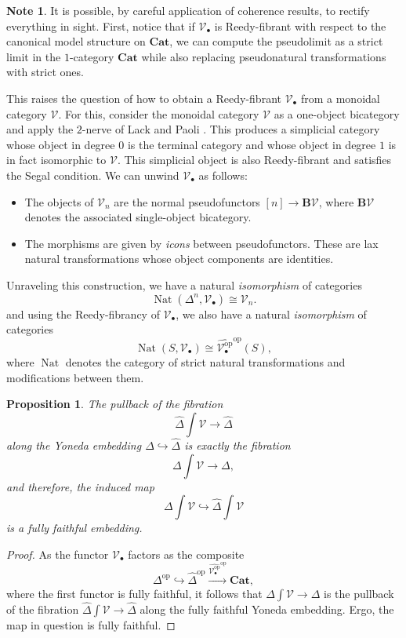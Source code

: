 \documentclass[a4paper]{article}
\numberwithin{equation}{subsection}
\theoremstyle{plain}   %
\newtheorem{prop}[equation]{Proposition}
\theoremstyle{definition}
\newtheorem{note}[equation]{Note}
\theoremstyle{remark}
\theoremstyle{plain}
\newcommand{\op}{\ensuremath{\mathrm{op}}}
\newcommand{\Cat}{\ensuremath{\mathbf{Cat}}}
\newcommand{\psh}[1]{\ensuremath{\widehat{#1}}}
\begin{document}
\begin{note}
	It is possible, by careful application of coherence results, to rectify everything in sight.  First, notice that if \(\mathcal{V}_\bullet\) is Reedy-fibrant with respect to the canonical model structure on \(\Cat\), we can compute the pseudolimit as a strict limit in the \(1\)-category \(\Cat\) while also replacing pseudonatural transformations with strict ones.  
	
	This raises the question of how to obtain a Reedy-fibrant \(\mathcal{V}_\bullet\) from a monoidal category \(\mathcal{V}\).  For this, consider the monoidal category \(\mathcal{V}\) as a one-object bicategory and apply the \(2\)-nerve of Lack and Paoli \cite{lack-paoli}.  This produces a simplicial category whose object in degree \(0\) is the terminal category and whose object in degree \(1\) is in fact isomorphic to \(\mathcal{V}\).  This simplicial object is also Reedy-fibrant and satisfies the Segal condition.  We can unwind \(\mathcal{V}_\bullet\) as follows:
	\begin{itemize}
		\item The objects of \(\mathcal{V}_n\) are the normal pseudofunctors \([n] \to \mathbf{B}\mathcal{V}\), where \(\mathbf{B}\mathcal{V}\) denotes the associated single-object bicategory.
		\item The morphisms are given by \emph{icons} between pseudofunctors.  These are lax natural transformations whose object components are identities.
	\end{itemize}
	Unraveling this construction, we have a natural \emph{isomorphism} of categories 
	\[
		\operatorname{Nat}(\Delta^n, \mathcal{V}_\bullet) \cong \mathcal{V}_n.
	\]
	and using the Reedy-fibrancy of \(\mathcal{V}_\bullet\), we also have a natural \emph{isomorphism} of categories
	\[
		\operatorname{Nat}(S,\mathcal{V}_\bullet) \cong \psh{\mathcal{V}^\op_\bullet}^\op(S),
	\]
	where \(\operatorname{Nat}\) denotes the category of strict natural transformations and modifications between them.
\end{note}
\begin{prop} The pullback of the fibration 
	\[
		\psh{\Delta}\int \mathcal{V} \to \psh{\Delta}
	\]
	along the Yoneda embedding \(\Delta\hookrightarrow \psh{\Delta}\) is exactly the fibration 
	\[
		\Delta\int\mathcal{V}\to \Delta,
	\]
	and therefore, the induced map
	\[
		\Delta\int\mathcal{V}\hookrightarrow \psh{\Delta}\int\mathcal{V}
	\]
	is a fully faithful embedding.
\end{prop}
\begin{proof}  As the functor \(\mathcal{V}_\bullet\) factors as the composite 
	\[\Delta^\op \hookrightarrow \psh{\Delta}^\op \xrightarrow{\psh{\mathcal{V}^\op_\bullet}^\op} \Cat,\] where the first functor is fully faithful, it follows that \(\Delta\int \mathcal{V} \to \Delta\) is the pullback of the fibration \(\psh{\Delta}\int \mathcal{V} \to \psh{\Delta}\) along the fully faithful Yoneda embedding.  Ergo, the map in question is fully faithful.  
\end{proof}
\end{document}
